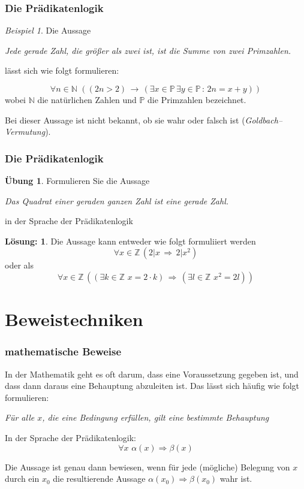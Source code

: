 \documentclass[hyperref={pdfpagelabels=false}]{beamer}
\theoremstyle{plain}%
\theoremstyle{definition}
\newtheorem*{uebung}{Übung}
\newtheorem*{sol}{Lösung:}
\theoremstyle{remark}
\newtheorem*{beispiel}{Beispiel}
\begin{document}
\begin{frame}
\frametitle{Die Prädikatenlogik}

\begin{beispiel}
Die Aussage
 
\centerline{\textit{Jede gerade Zahl, die größer als zwei ist, ist die Summe von zwei Primzahlen.}}

lässt sich wie folgt formulieren: \pause 

  	$$ \forall n \in \mathbb N \, \, \left( ( 2n > 2 ) \, \rightarrow \, (\exists x \in \mathbb P \, \exists y \in 
    	\mathbb P \, : \, 2n = x + y) \right) $$
wobei $\mathbb N$ die natürlichen Zahlen und $\mathbb P$ die Primzahlen bezeichnet. 

\pause

Bei dieser Aussage ist nicht bekannt, ob sie wahr oder falsch ist (\textit{Goldbach--Vermutung}). 
\end{beispiel}

\end{frame}


\begin{frame}
\frametitle{Die Prädikatenlogik}

\begin{uebung}
Formulieren Sie die Aussage 
	\centerline{\textit{Das Quadrat einer geraden ganzen Zahl ist eine gerade Zahl.}}
in der Sprache der  Prädikatenlogik
\end{uebung}

\pause \pause 

\bigbreak

\begin{sol}
Die Aussage kann entweder wie folgt formuliiert werden 
  	$$ \forall x \in \mathbb Z \, \left( 2 \vert x\, \Longrightarrow \, 2 \vert x^2 \right) $$
oder als 
  	$$ \forall x \in \mathbb Z \, \left( (\exists k \in \mathbb Z \,\, x = 2 \cdot k) \, \Longrightarrow \, 
	(\exists l \in \mathbb Z \,\,  x^2 = 2 l) \right) $$
\end{sol}

\end{frame}

\section{Beweistechniken}

\begin{frame}
\frametitle{mathematische Beweise}

In der Mathematik geht es oft darum, dass eine Voraussetzung gegeben ist, und dass dann daraus eine 
Behauptung abzuleiten ist. Das lässt sich häufig wie folgt formulieren: 

\centerline{\textit{ Für alle $x$, die eine Bedingung erfüllen, gilt eine bestimmte Behauptung}} 

\pause 

In der Sprache der Prädikatenlogik: 
	$$ \forall x \,\, \alpha(x) \Longrightarrow \beta(x) $$

\pause

Die Aussage ist genau dann bewiesen, wenn für jede (mögliche) Belegung von $x$ durch ein $x_0$ die 
resultierende  Aussage $\alpha(x_0) \Longrightarrow \beta(x_0) $ wahr ist. 
\end{frame}
\end{document}

